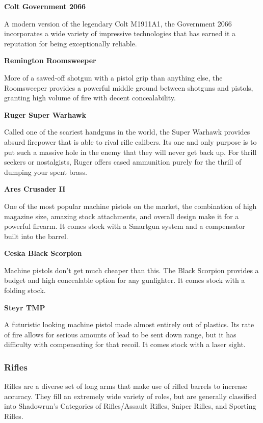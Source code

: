 \begin{mdframed}[linewidth=0pt]
\begin{multicols}{2}
		\textbf{Colt Government 2066}
		
		A modern version of the legendary Colt M1911A1, the Government 2066 incorporates a wide variety of impressive technologies that has earned it a reputation for being exceptionally reliable.
		
		\textbf{Remington Roomsweeper}
		
		More of a sawed-off shotgun with a pistol grip than anything else, the Roomsweeper provides a powerful middle ground between shotguns and pistols, granting high volume of fire with decent concealability.
		
		\textbf{Ruger Super Warhawk}
		
		Called one of the scariest handguns in the world, the Super Warhawk provides absurd firepower that is able to rival rifle calibers. Its one and only purpose is to put such a massive hole in the enemy that they will never get back up. For thrill seekers or nostalgists, Ruger offers cased ammunition purely for the thrill of dumping your spent brass.
		
		\textbf{Ares Crusader II}
		
		One of the most popular machine pistols on the market, the combination of high magazine size, amazing stock attachments, and overall design make it for a powerful firearm. It comes stock with a Smartgun system and a compensator built into the barrel.
		
		\textbf{Ceska Black Scorpion}
		
		Machine pistols don't get much cheaper than this. The Black Scorpion provides a budget and high concealable option for any gunfighter. It comes stock with a folding stock.
		
		\textbf{Steyr TMP}
		
		A futuristic looking machine pistol made almost entirely out of plastics. Its rate of fire allows for serious amounts of lead to be sent down range, but it has difficulty with compensating for that recoil. It comes stock with a laser sight.
		
	\end{multicols}
\end{mdframed}

\subsubsection{Rifles}

Rifles are a diverse set of long arms that make use of rifled barrels to increase accuracy. They fill an extremely wide variety of roles, but are generally classified into Shadowrun's Categories of Rifles/Assault Rifles, Sniper Rifles, and Sporting Rifles.

